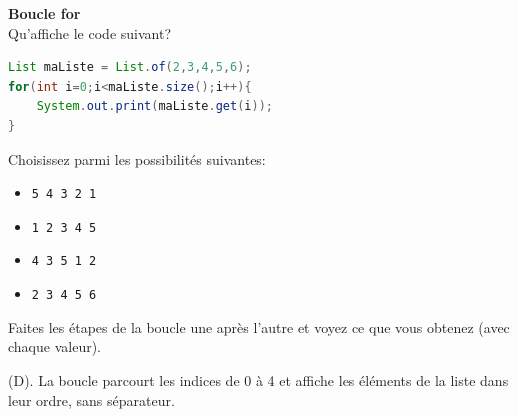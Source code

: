     
    \begin{Exercice}[5 minutes] [Java] \textbf{Boucle for}\\
      	Qu'affiche le code suivant?
      	
      	\begin{lstlisting}[language=Java]
List maListe = List.of(2,3,4,5,6);
for(int i=0;i<maListe.size();i++){
    System.out.print(maListe.get(i));
}
        	 \end{lstlisting}
             	
        Choisissez parmi les possibilités suivantes:
        
        \begin{itemize}
            \item[(A)] \texttt{5 4 3 2 1}
            \item[(B)] \texttt{1 2 3 4 5}
            \item[(C)] \texttt{4 3 5 1 2}
            \item[(D)] \texttt{2 3 4 5 6}
        \end{itemize}
    
        \begin{conseil}
		   Faites les étapes de la boucle une après l'autre et voyez ce que vous obtenez (avec chaque valeur).  
        \end{conseil}
        
        \begin{solution}
            (D). La boucle parcourt les indices de 0 à 4 et affiche les éléments de la liste dans leur ordre, sans séparateur.
        \end{solution}
    \end{Exercice} 	
    
